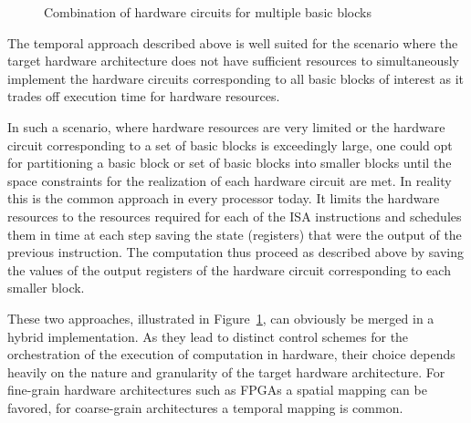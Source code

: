 \begin{figure}[htbp]
  \centering

\caption{Combination of hardware circuits for multiple basic blocks}
\label{fig:Fig.4.4}
\end{figure}

The temporal approach described above is well suited for the scenario where the target hardware architecture does not have sufficient resources to simultaneously implement the hardware circuits corresponding to all basic blocks of interest as it trades off execution time for hardware resources.

In such a scenario, where hardware resources are very limited or the hardware circuit corresponding to a set of basic blocks is exceedingly large, one could opt for partitioning a basic block or set of basic blocks into smaller blocks until the space constraints for the realization of each hardware circuit are met. 
In reality this is the common approach in every processor today. 
It limits the hardware resources to the resources required for each of the ISA instructions and schedules them in time at each step saving the state (registers) that were the output of the previous instruction. 
The computation thus proceed as described above by saving the values of the output registers of the hardware circuit corresponding to each smaller block.

These two approaches, illustrated in Figure~\ref{fig:Fig.4.4}, can obviously be merged in a hybrid implementation. 
As they lead to distinct control schemes for the orchestration of the execution of computation in hardware, their choice depends heavily on the nature and granularity of the target hardware architecture. 
For fine-grain hardware architectures such as FPGAs a spatial mapping can be favored, for coarse-grain architectures a temporal mapping is common.

